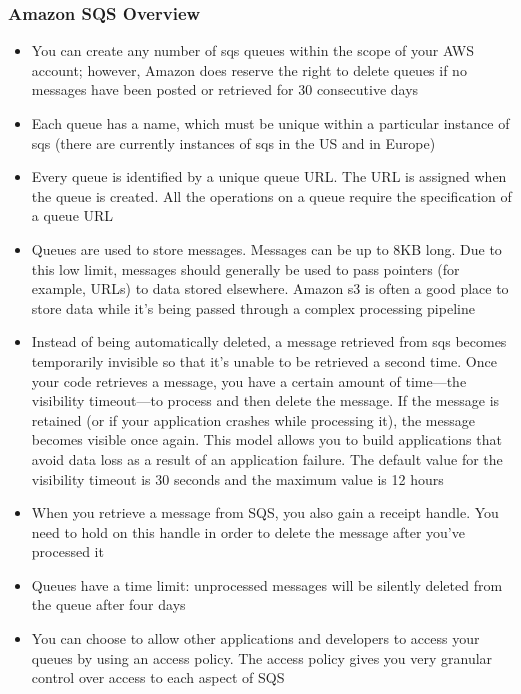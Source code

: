 \documentclass{beamer}
\begin{document}
\begin{frame}
\frametitle{Amazon SQS Overview}
\begin{itemize}
\item You can create any number of \acrshort{sqs} queues within the scope of your AWS account;
however, Amazon does reserve the right to delete queues if no messages have been
posted or retrieved for 30 consecutive days

\item Each queue has a name, which must be unique within a particular instance of \acrshort{sqs}
(there are currently instances of \acrshort{sqs} in the US and in Europe)
\item Every queue is identified by a unique queue URL. The URL is assigned when the
queue is created. All the operations on a queue require the specification of a queue
URL
\item Queues are used to store messages. Messages can be up to 8KB long. Due to
this low limit, messages should generally be used to pass pointers (for example,
URLs) to data stored elsewhere. Amazon \acrshort{s3} is often a good place to store data while
it’s being passed through a complex processing pipeline

\item Instead of being automatically deleted, a message retrieved from \acrshort{sqs} becomes
temporarily invisible so that it’s unable to be retrieved a second time. Once your
code retrieves a message, you have a certain amount of time—the visibility
timeout—to process and then delete the message. If the message is retained (or if
your application crashes while processing it), the message becomes visible once
again. This model allows you to build applications that avoid data loss as a result
of an application failure. The default value for the visibility timeout is 30 seconds
and the maximum value is 12 hours

\item When you retrieve a message from SQS, you also gain a receipt handle. You need
to hold on this handle in order to delete the message after you’ve processed it

\item Queues have a time limit: unprocessed messages will be silently deleted from the
queue after four days

\item You can choose to allow other applications and developers to access your queues
by using an access policy. The access policy gives you very granular control over
access to each aspect of SQS

\end{itemize}

\end{frame}
\end{document}
